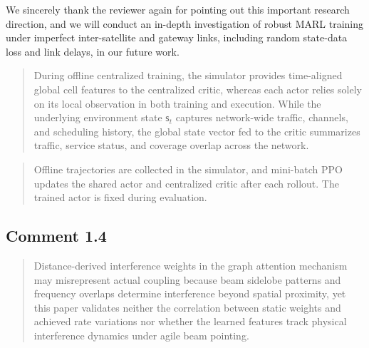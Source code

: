 \documentclass[11pt,a4paper]{article}
\newcommand{\qrev}[1]{{\color{qinrev}#1}}
\begin{document}
We sincerely thank the reviewer again for pointing out this important research direction, and we will conduct an in-depth investigation of robust MARL training under imperfect inter-satellite and gateway links, including random state-data loss and link delays, in our future work.
\par


\begin{quote}\small\color{revisionblue}
During offline centralized training, \qrev{the simulator provides time-aligned global cell features to the centralized critic, whereas each actor relies solely on its local observation in both training and execution. While the underlying environment state $\mathsf{s}_t$ captures network-wide traffic, channels, and scheduling history, the global state vector fed to the critic summarizes traffic, service status, and coverage overlap across the network.}
\par
\end{quote}


\begin{quote}\small\color{revisionblue}
Offline trajectories are collected in the simulator, and mini-batch PPO updates the shared actor and centralized critic after each rollout. The trained actor is fixed during evaluation.
\par
\end{quote}


\subsection*{Comment 1.4}

\begin{quote}\small Distance-derived interference weights in the graph attention mechanism may misrepresent actual coupling because beam sidelobe patterns and frequency overlaps determine interference beyond spatial proximity, yet this paper validates neither the correlation between static weights and achieved rate variations nor whether the learned features track physical interference dynamics under agile beam pointing.\end{quote}
\end{document}
